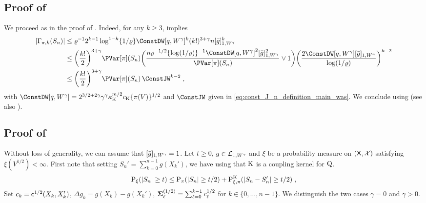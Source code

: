 \subsection{Proof of }
\label{sec:proof_bernstein_bound_wasserstein}
We proceed as in the proof of . Indeed, for any $k \geq 3$,  implies
\begin{equation*}
\begin{split}
|\Gamma_{\pi, k}(S_n)|
&\leq \ratewas^{-1} 2^{k-1}\log^{1-k}\{1/\ratewas\} \ConstDW[q,W^{\gamma}]^{k} (k!)^{3+\gamma} n \Nnorm[1, W^{\gamma}]{\bar{g}}^{k} \\
&\leq \biggl(\frac{k!}{2}\biggr)^{3+\gamma}\PVar[\pi](S_n) \biggl( \frac{n \ratewas^{-1/2} \{\log(1/\ratewas)\}^{-1} \ConstDW[q,W^\gamma]^{2} \Nnorm[1, W^{\gamma}]{\bar{g}}^{2}}{\PVar[\pi](S_n)} \vee 1\biggr) \biggl( \frac{2 \ConstDW[q,W^\gamma] \Nnorm[1, W^{\gamma}]{\bar{g}}}{\log(1/\ratewas)} \biggr)^{k-2} \\
&\leq \biggl(\frac{k!}{2}\biggr)^{3+\gamma}\PVar[\pi](S_n)\,\ConstJW^{k-2}\eqsp,
\end{split}
\end{equation*}
with $\ConstDW[q,W^\gamma] = 2^{3/2+2\gamma}\gamma^{\gamma}\boundmetric^{m/2} \vartconstwas \{\pi(V)\}^{1/2}$ and $\ConstJW$ given in \eqref{eq:const_J_n_definition_main_was}. We conclude using \cite[Lemma~2.1]{bentkus:1980} (see also \cite[Equation~(24)]{doukhan2007probability}).

\subsection{Proof of }
\label{sec:proof-crefth:r_th:rosenthal_log_V_cor_2_wasserstein_non_statio}
Without loss of generality, we can assume that $\Nnorm[1, W^{\gamma}]{\bar{g}} = 1$. Let $t \geq 0$, $g \in \Lclass_{1, W^\gamma}$ and  $\xi$ be a probability measure on $(\Xset,\Xsigma)$ satisfying $\xi(V^{1/2}) < \infty$.  First note that setting $S_n' = \sum_{k=0}^{n-1} g(X_k')$, we have using that $\MKK$ is a coupling kernel for $\MK$.
  \begin{equation}
    \label{eq:rosenthal_log_V_cor_2_wasserstein_non_statio_00}
  \PP_{\xi}(|S_n| \geq t) \leq \PP_{\pi}(|S_n| \geq t/2) + \PP_{\xi,\pi}^{\MKK}(|S_n-S_n'| \geq t/2)\eqsp,
\end{equation}
Set $c_k = \cost^{1/2}(X_k,X_k')$, $\Delta g_k = g(X_k)-g(X_k')$, $\Sigmabf^{(1/2)}_{\ell} = \sum_{\ell=0}^{k-1}c_{\ell}^{1/2}$ for $k \in\{0,\ldots,n-1\}$.
We distinguish the two cases $\gamma =0$ and $\gamma >0$.

